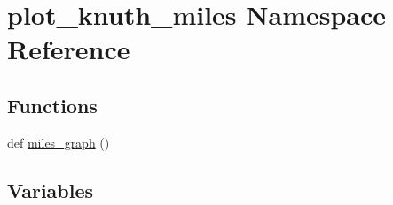 \hypertarget{namespaceplot__knuth__miles}{}\section{plot\+\_\+knuth\+\_\+miles Namespace Reference}
\label{namespaceplot__knuth__miles}
\subsection*{Functions}
\begin{DoxyCompactItemize}
\item 
def \hyperlink{namespaceplot__knuth__miles_adc1cff9bd985e43d399b6000acc39271}{miles\+\_\+graph} ()
\end{DoxyCompactItemize}
\subsection*{Variables}
